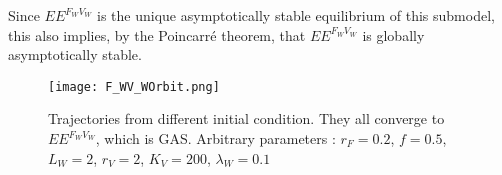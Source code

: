 \documentclass{article}
\newcommand{\lfw}{\lambda_{F}}
\newcommand{\lvw}{\lambda_{V}}
\newcommand{\lfv}{\lambda_{W}}
\begin{document}
Since $EE^{F_WV_W}$ is the unique asymptotically stable equilibrium of this submodel, this also implies, by the Poincarré theorem, that $EE^{F_WV_W}$ is globally asymptotically stable.

\begin{figure}[!ht]
\centering
\texttt{[image: F\_WV\_WOrbit.png]}
\caption{\centering Trajectories from different initial condition. They all converge to  $EE^{F_WV_W}$, which is GAS. \newline Arbitrary parameters : $r_F = 0.2$, $f = 0.5$, $L_W = 2$, $r_V = 2$, $K_V = 200$, $\lfv = 0.1$}
\end{figure}


%
%
%
\end{document}

